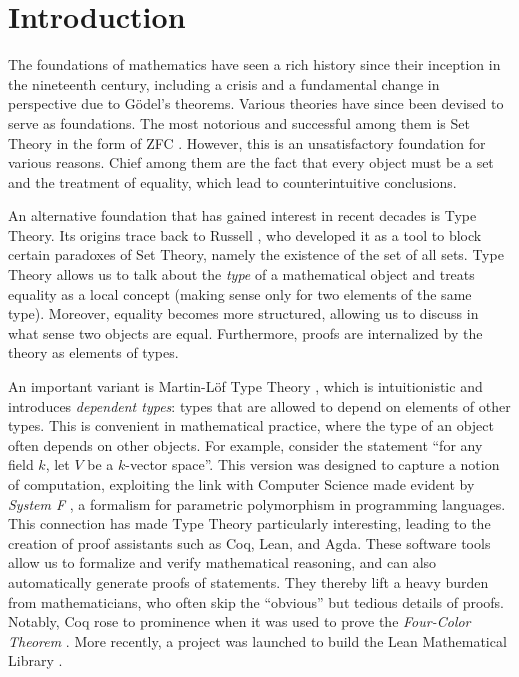 \chapter*{Introduction}

The foundations of mathematics have seen a rich history since their inception in
the nineteenth century, including a crisis and a fundamental change in
perspective due to Gödel's theorems. Various theories have since been
devised to serve as foundations. The most notorious and successful among them is
Set Theory in the form of ZFC \cite{Jec13}. However, this is an
unsatisfactory foundation for various reasons. Chief among them are the fact that every object must be a set and
the treatment of equality, which lead to counterintuitive
conclusions.

An alternative foundation that has gained interest in recent decades is
Type Theory. Its origins trace back to Russell \cite{Rus08,RW97},
who developed it as a tool to
block certain paradoxes of Set Theory,
namely the existence of the set of all sets. Type Theory allows us to talk about
the \emph{type} of a mathematical object and treats equality as a local concept
(making sense only for two elements of the same type). Moreover, equality becomes
more structured, allowing us to discuss in what sense two objects are equal.
Furthermore, proofs are internalized by the theory as elements of types.

An important variant is Martin-L{\"o}f Type Theory \cite{ML84}, which is
intuitionistic and introduces \emph{dependent types}: types that are
allowed to depend on elements of other types. This is convenient in
mathematical practice, where the type of an object often depends on other
objects. For example, consider the statement ``for any field
$k$, let $V$ be a $k$-vector space''. This version was designed
to capture a notion of computation, exploiting the link with Computer Science
made evident by \emph{System F} \cite{Gir89}, a formalism for parametric
polymorphism in programming languages. This connection
has made Type Theory particularly interesting, leading to the
creation of proof assistants such as Coq, Lean, and Agda. These software
tools allow us to formalize and verify mathematical reasoning, and can also
automatically generate proofs of statements. They thereby lift a heavy burden from
mathematicians, who often skip the ``obvious'' but tedious
details of proofs. Notably, Coq rose to prominence when it was used to
prove the \emph{Four-Color Theorem} \cite{Gon08}. More recently, a project
was launched to build the Lean Mathematical Library \cite{mat20}.

